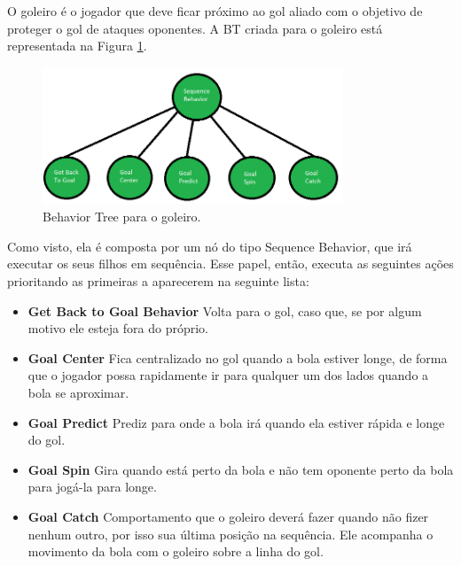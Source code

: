 \documentclass[conference]{IEEEtran}
\begin{document}
O goleiro é o jogador que deve ficar próximo ao gol aliado com o objetivo de proteger o gol de ataques oponentes. 
A BT criada para o goleiro está representada na Figura \ref{fig:goalier_bt}.

\begin{figure}[H]
	\centering
	\includegraphics[width=0.8\textwidth]{figures/Goalier_BT.png}
   	\caption{Behavior Tree para o goleiro.} \label{fig:goalier_bt}
\end{figure}

Como visto, ela é composta por um nó do tipo Sequence Behavior, que irá executar os seus filhos em sequência. Esse papel, então, executa as seguintes ações prioritando as primeiras a aparecerem na seguinte lista:

\begin{itemize}

\item \textbf{Get Back to Goal Behavior} Volta para o gol, caso que, se por algum motivo ele esteja fora do próprio.

\item \textbf{Goal Center} Fica centralizado no gol quando a bola estiver longe, de forma que o jogador possa rapidamente ir para qualquer um dos lados quando a bola se aproximar.

\item \textbf{Goal Predict} Prediz para onde a bola irá quando ela estiver rápida e longe do gol.

\item \textbf{Goal Spin} Gira quando está perto da bola e não tem oponente perto da bola para jogá-la para longe.

\item \textbf{Goal Catch} Comportamento que o goleiro deverá fazer quando não fizer nenhum outro, por isso sua última posição na sequência. Ele acompanha o movimento da bola com o goleiro sobre a linha do gol.

\end{itemize}
\end{document}
